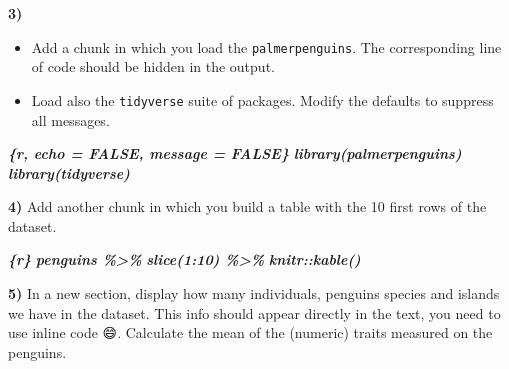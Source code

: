 \documentclass[
  12pt,
]{book}
\newenvironment{Shaded}{\begin{snugshade}}{\end{snugshade}}
\newcommand{\FunctionTok}[1]{\textcolor[rgb]{0.00,0.00,0.00}{#1}}
\newcommand{\InformationTok}[1]{\textcolor[rgb]{0.56,0.35,0.01}{\textbf{\textit{#1}}}}
\newcommand{\NormalTok}[1]{#1}
\providecommand{\tightlist}{%
  \setlength{\itemsep}{0pt}\setlength{\parskip}{0pt}}
\begin{document}
\textbf{3)}

\begin{itemize}
\tightlist
\item
  Add a chunk in which you load the \texttt{palmerpenguins}. The corresponding line of code should be hidden in the output.
\item
  Load also the \texttt{tidyverse} suite of packages. Modify the defaults to suppress all messages.
\end{itemize}

\begin{Shaded}
\begin{Highlighting}[]
\InformationTok{\textasciigrave{}\textasciigrave{}\textasciigrave{}\{r, echo = FALSE, message = FALSE\}}
\InformationTok{library(palmerpenguins)}
\InformationTok{library(tidyverse)}
\InformationTok{\textasciigrave{}\textasciigrave{}\textasciigrave{}}
\end{Highlighting}
\end{Shaded}

\textbf{4)} Add another chunk in which you build a table with the 10 first rows of the dataset.

\begin{Shaded}
\begin{Highlighting}[]
\InformationTok{\textasciigrave{}\textasciigrave{}\textasciigrave{}\{r\}}
\InformationTok{penguins \%\textgreater{}\%}
\InformationTok{  slice(1:10) \%\textgreater{}\%}
\InformationTok{  knitr::kable()}
\InformationTok{\textasciigrave{}\textasciigrave{}\textasciigrave{}}
\end{Highlighting}
\end{Shaded}

\textbf{5)} In a new section, display how many individuals, penguins species and islands we have in the dataset. This info should appear directly in the text, you need to use inline code 😄. Calculate the mean of the (numeric) traits measured on the penguins.

\begin{Shaded}
\end{Shaded}
\end{document}
